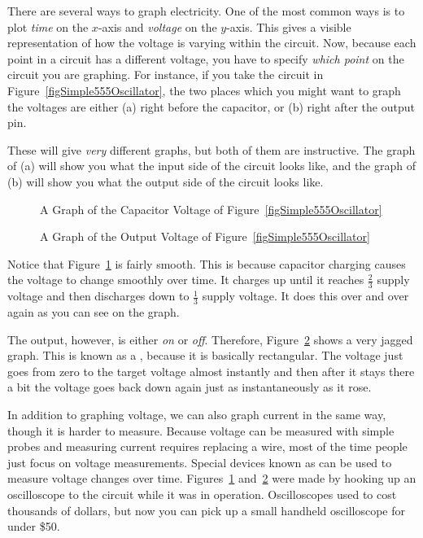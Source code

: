 There are several ways to graph electricity.
One of the most common ways is to plot \emph{time} on the $x$-axis and \emph{voltage} on the $y$-axis.  
This gives a visible representation of how the voltage is varying within the circuit.
Now, because each point in a circuit has a different voltage, you have to specify \emph{which point} on the circuit you are graphing.
For instance, if you take the circuit in Figure~\ref{figSimple555Oscillator}, the two places which you might want to graph the voltages are either (a) right before the capacitor, or (b) right after the output pin.

These will give \emph{very} different graphs, but both of them are instructive.  The graph of (a) will show you what the input side of the circuit looks like, and the graph of (b) will show you what the output side of the circuit looks like.

\begin{figure}
\caption{A Graph of the Capacitor Voltage of Figure~\ref{figSimple555Oscillator}}
\label{fig555CapacitorVoltage}
\end{figure}

\begin{figure}
\caption{A Graph of the Output Voltage of Figure~\ref{figSimple555Oscillator}}
\label{fig555OutputVoltage}
\end{figure}

Notice that Figure~\ref{fig555CapacitorVoltage} is fairly smooth.
This is because capacitor charging causes the voltage to change smoothly over time.
It charges up until it reaches $\frac{2}{3}$ supply voltage and then discharges down to $\frac{1}{3}$ supply voltage.
It does this over and over again as you can see on the graph.

The output, however, is either \emph{on} or \emph{off}.  
Therefore, Figure~\ref{fig555OutputVoltage} shows a very jagged graph.
This is known as a , because it is basically rectangular.
The voltage just goes from zero to the target voltage almost instantly and then after it stays there a bit the voltage goes back down again just as instantaneously as it rose.

In addition to graphing voltage, we can also graph current in the same way, though it is harder to measure.
Because voltage can be measured with simple probes and measuring current requires replacing a wire, most of the time people just focus on voltage measurements.
Special devices known as  can be used to measure voltage changes over time.
Figures~\ref{fig555CapacitorVoltage} and~\ref{fig555OutputVoltage} were made by hooking up an oscilloscope to the circuit while it was in operation.
Oscilloscopes used to cost thousands of dollars, but now you can pick up a small handheld oscilloscope for under \$50.

